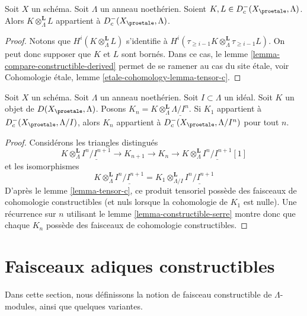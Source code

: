 \begin{lemma}
\label{lemma-tensor-c}
Soit $X$ un schéma. Soit $\Lambda$ un anneau noethérien.
Soient $K, L \in D_c^-(X_\proetale, \Lambda)$. Alors
$K \otimes_\Lambda^\mathbf{L} L$ appartient à $D_c^-(X_\proetale, \Lambda)$.
\end{lemma}

\begin{proof}
Notons que $H^i(K \otimes_\Lambda^\mathbf{L} L)$ s'identifie à
$H^i(\tau_{\geq i - 1}K \otimes_\Lambda^\mathbf{L} \tau_{\geq i - 1}L)$.
On peut donc supposer que $K$ et $L$ sont bornés.
Dans ce cas, le lemme \ref{lemma-compare-constructible-derived} permet de
se ramener au cas du site \'etale, voir
Cohomologie \'etale, lemme \ref{etale-cohomology-lemma-tensor-c}.
\end{proof}

\begin{lemma}
\label{lemma-compare-truncations-constructible}
Soit $X$ un schéma. Soit $\Lambda$ un anneau noethérien.
Soit $I \subset \Lambda$ un idéal.
Soit $K$ un objet de $D(X_\proetale, \Lambda)$.
Posons $K_n = K \otimes_\Lambda^\mathbf{L} \underline{\Lambda/I^n}$.
Si $K_1$ appartient à $D^-_c(X_\proetale, \Lambda/I)$, alors
$K_n$ appartient à $D^-_c(X_\proetale, \Lambda/I^n)$ pour tout $n$.
\end{lemma}

\begin{proof}
Considérons les triangles distingués
$$
K \otimes_\Lambda^\mathbf{L} \underline{I^n/I^{n + 1}} \to
K_{n + 1} \to
K_n \to
K \otimes_\Lambda^\mathbf{L} \underline{I^n/I^{n + 1}}[1]
$$
et les isomorphismes
$$
K \otimes_\Lambda^\mathbf{L} \underline{I^n/I^{n + 1}} =
K_1 \otimes_{\Lambda/I}^\mathbf{L} \underline{I^n/I^{n + 1}}
$$
D'après le lemme \ref{lemma-tensor-c}, ce produit tensoriel possède des
faisceaux de cohomologie constructibles (et nuls lorsque la cohomologie de $K_1$
est nulle). Une récurrence sur $n$ utilisant le
lemme \ref{lemma-constructible-serre}
montre donc que chaque $K_n$ possède des faisceaux de cohomologie constructibles.
\end{proof}








\section{Faisceaux adiques constructibles}
\label{section-adic}

\noindent
Dans cette section, nous définissons la notion de faisceau
constructible de $\Lambda$-modules, ainsi que quelques variantes.

